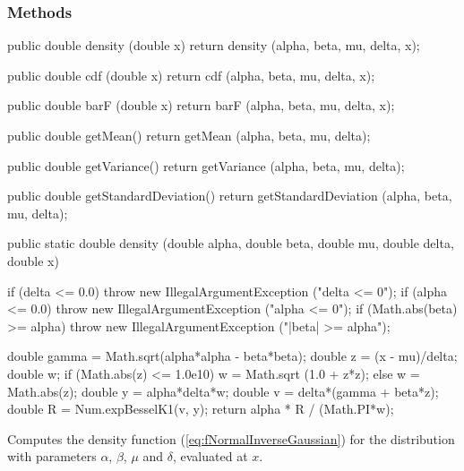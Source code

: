 \subsubsection* {Methods}

\begin{code}\begin{hide}

   public double density (double x) {
      return density (alpha, beta, mu, delta, x);
   }

   public double cdf (double x) {
      return cdf (alpha, beta, mu, delta, x);
   }

   public double barF (double x) {
      return barF (alpha, beta, mu, delta, x);
   }

   public double getMean() {
      return getMean (alpha, beta, mu, delta);
   }

   public double getVariance() {
      return getVariance (alpha, beta, mu, delta);
   }

   public double getStandardDeviation() {
      return getStandardDeviation (alpha, beta, mu, delta);
   }\end{hide}

   public static double density (double alpha, double beta, double mu,
                                 double delta, double x)\begin{hide} {
      if (delta <= 0.0)
         throw new IllegalArgumentException ("delta <= 0");
      if (alpha <= 0.0)
         throw new IllegalArgumentException ("alpha <= 0");
      if (Math.abs(beta) >= alpha)
         throw new IllegalArgumentException ("|beta| >= alpha");

      double gamma = Math.sqrt(alpha*alpha - beta*beta);
      double z = (x - mu)/delta;
      double w;
      if (Math.abs(z) <= 1.0e10)
         w = Math.sqrt (1.0 + z*z);
      else
         w = Math.abs(z);
      double y = alpha*delta*w;
      double v = delta*(gamma + beta*z);
      double R = Num.expBesselK1(v, y);
      return alpha * R / (Math.PI*w);
   }\end{hide}
\end{code}
\begin{tabb} Computes the density function (\ref{eq:fNormalInverseGaussian})
     for the \nig{} distribution with parameters $\alpha$, $\beta$, $\mu$
    and  $\delta$, evaluated at $x$.
\end{tabb}
